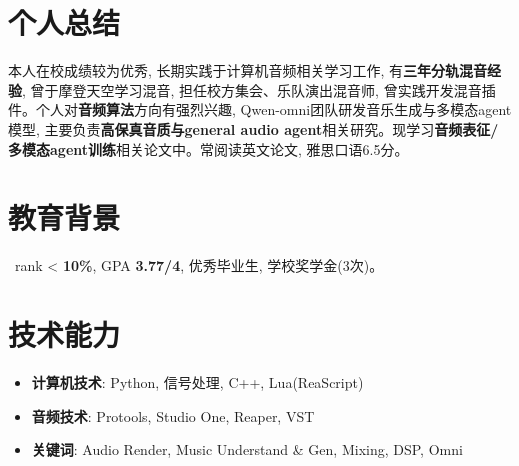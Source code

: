 \documentclass{resume}
\begin{document}





\section{个人总结}
本人在校成绩较为优秀, 长期实践于计算机音频相关学习工作, 有\textbf{三年分轨混音经验}, 曾于摩登天空学习混音, 担任校方集会、乐队演出混音师, 曾实践开发混音插件。个人对\textbf{音频算法}方向有强烈兴趣, Qwen-omni团队研发音乐生成与多模态agent模型, 主要负责\textbf{高保真音质与general audio agent}相关研究。现学习\textbf{音频表征/多模态agent训练}相关论文中。常阅读英文论文, 雅思口语6.5分。

\section{教育背景}
\ rank < \textbf{10\%}, GPA \textbf{3.77/4}, 优秀毕业生, 学校奖学金(3次)。

\section{技术能力}
\begin{itemize}[parsep=0.2ex]
  \item \textbf{计算机技术}: Python, 信号处理, C++, Lua(ReaScript)
  \item \textbf{音频技术}: Protools, Studio One, Reaper, VST
  \item \textbf{关键词}: Audio Render, Music Understand \& Gen, Mixing, DSP, Omni
\end{itemize}
\end{document}
